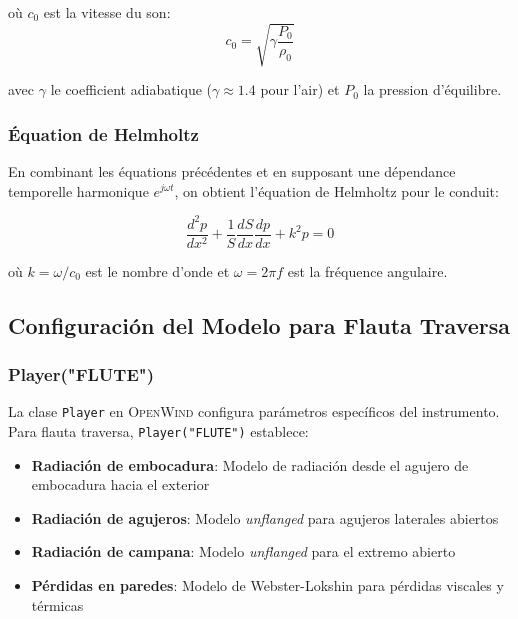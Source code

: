 \documentclass[12pt,a4paper,twocolumn]{article}
\newcommand{\openwind}{\textsc{OpenWind}}
\begin{document}
où $c_0$ est la vitesse du son:
\begin{equation}
c_0 = \sqrt{\gamma \frac{P_0}{\rho_0}}
\end{equation}

avec $\gamma$ le coefficient adiabatique ($\gamma \approx 1.4$ pour l'air) et $P_0$ la pression d'équilibre.

\subsubsection{Équation de Helmholtz}

En combinant les équations précédentes et en supposant une dépendance temporelle harmonique $e^{j\omega t}$, on obtient l'équation de Helmholtz pour le conduit:

\begin{equation}
\frac{d^2 p}{dx^2} + \frac{1}{S}\frac{dS}{dx}\frac{dp}{dx} + k^2 p = 0
\label{eq:helmholtz-fr}
\end{equation}

où $k = \omega/c_0$ est le nombre d'onde et $\omega = 2\pi f$ est la fréquence angulaire.

\subsection{Configuración del Modelo para Flauta Traversa}

\subsubsection{Player("FLUTE")}

La clase \texttt{Player} en \openwind{} configura parámetros específicos del instrumento. Para flauta traversa, \texttt{Player("FLUTE")} establece:

\begin{itemize}
    \item \textbf{Radiación de embocadura}: Modelo de radiación desde el agujero de embocadura hacia el exterior
    \item \textbf{Radiación de agujeros}: Modelo \textit{unflanged} para agujeros laterales abiertos
    \item \textbf{Radiación de campana}: Modelo \textit{unflanged} para el extremo abierto
    \item \textbf{Pérdidas en paredes}: Modelo de Webster-Lokshin para pérdidas viscales y térmicas
\end{itemize}
\end{document}
